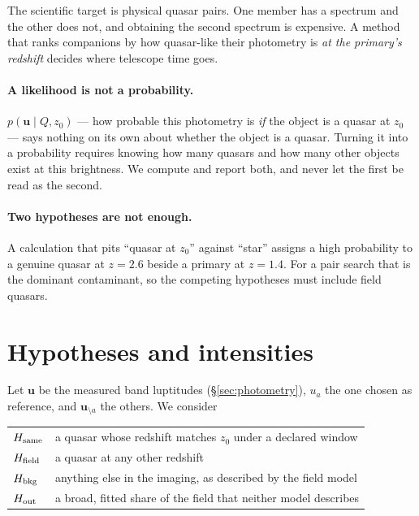 \documentclass[11pt,a4paper]{article}
\newcommand{\uvec}{\mathbf{u}}
\newcommand{\Hsame}{H_{\rm same}}
\newcommand{\Hfield}{H_{\rm field}}
\newcommand{\Hbkg}{H_{\rm bkg}}
\newcommand{\Hout}{H_{\rm out}}
\begin{document}
The scientific target is physical quasar pairs. One member has a spectrum and
the other does not, and obtaining the second spectrum is expensive. A method
that ranks companions by how quasar-like their photometry is \emph{at the
primary's redshift} decides where telescope time goes.

\paragraph{A likelihood is not a probability.} $p(\uvec\mid Q,z_0)$ --- how
probable this photometry is \emph{if} the object is a quasar at $z_0$ --- says
nothing on its own about whether the object is a quasar. Turning it into a
probability requires knowing how many quasars and how many other objects exist
at this brightness. We compute and report both, and never let the first be read
as the second.

\paragraph{Two hypotheses are not enough.} A calculation that pits ``quasar at
$z_0$'' against ``star'' assigns a high probability to a genuine quasar at
$z=2.6$ beside a primary at $z=1.4$. For a pair search that is the dominant
contaminant, so the competing hypotheses must include field quasars.

\section{Hypotheses and intensities}
\label{sec:hypotheses}

Let $\uvec$ be the measured band luptitudes (\S\ref{sec:photometry}), $u_a$ the
one chosen as reference, and $\uvec_{\setminus a}$ the others. We consider

\begin{center}
\begin{tabular}{ll}
\toprule
$\Hsame$ & a quasar whose redshift matches $z_0$ under a declared window \\
$\Hfield$ & a quasar at any other redshift \\
$\Hbkg$ & anything else in the imaging, as described by the field model \\
$\Hout$ & a broad, fitted share of the field that neither model describes \\
\bottomrule
\end{tabular}
\end{center}
\end{document}
